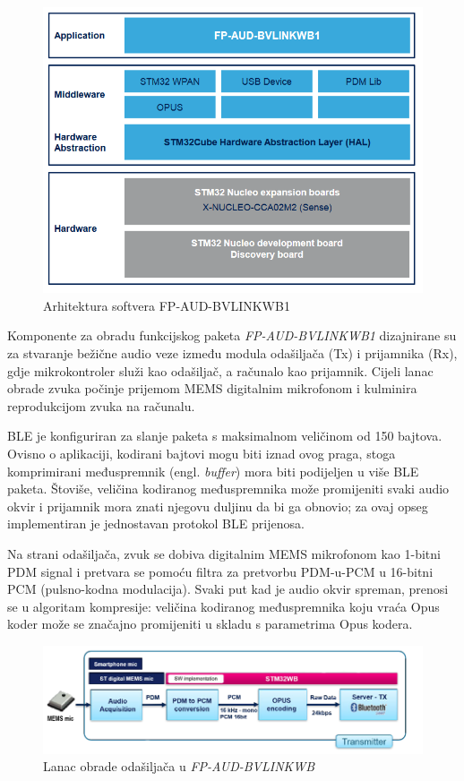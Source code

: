 \begin{figure}[ht]
	\includegraphics[width=\linewidth]{imgs/firmware_software_arch}
	\caption{Arhitektura softvera FP-AUD-BVLINKWB1}
	\label{fig:firmware_software_arch}
\end{figure}

Komponente za obradu funkcijskog paketa \textit{FP-AUD-BVLINKWB1} dizajnirane su za stvaranje bežične audio veze između modula odašiljača (Tx) i prijamnika (Rx), gdje mikrokontroler služi kao odašiljač, a računalo kao prijamnik. Cijeli lanac obrade zvuka počinje prijemom MEMS digitalnim mikrofonom i kulminira reprodukcijom zvuka na računalu.

BLE je konfiguriran za slanje paketa s maksimalnom veličinom od 150 bajtova. Ovisno o aplikaciji, kodirani bajtovi mogu biti iznad ovog praga, stoga komprimirani međuspremnik (engl. \textit{buffer}) mora biti podijeljen u više BLE paketa. Štoviše, veličina kodiranog međuspremnika može promijeniti svaki audio okvir i prijamnik mora znati njegovu duljinu da bi ga obnovio; za ovaj opseg implementiran je jednostavan protokol BLE prijenosa.

Na strani odašiljača, zvuk se dobiva digitalnim MEMS mikrofonom kao 1-bitni PDM signal i pretvara se pomoću filtra za pretvorbu PDM-u-PCM u 16-bitni PCM (pulsno-kodna modulacija). Svaki put kad je audio okvir spreman, prenosi se u algoritam kompresije: veličina kodiranog međuspremnika koju vraća Opus koder može se značajno promijeniti u skladu s parametrima Opus kodera.

\begin{figure}[ht]
	\includegraphics[width=\linewidth]{imgs/duplex_chain}
	\caption{Lanac obrade odašiljača u \textit{FP-AUD-BVLINKWB}}
	\label{fig:duplex_chain}
\end{figure}

